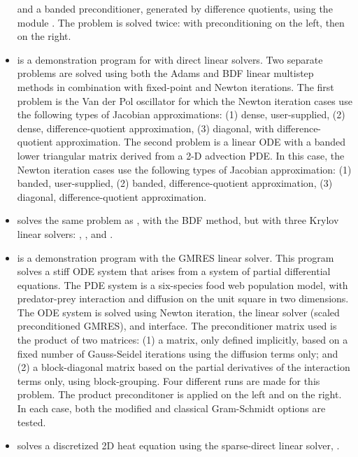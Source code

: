 \begin{itemize}
  and a banded preconditioner, generated by difference quotients,
  using the module {\cvbandpre}.
  \newline
  The problem is solved twice: with preconditioning on the left,
  then on the right.
\item {}
  is a demonstration program for {\cvode} with direct linear solvers.
  \newline
  Two separate problems are solved using both the Adams and BDF linear
  multistep methods in combination with fixed-point and Newton
  iterations.
  \newline
  The first problem is the Van der Pol oscillator for which
  the Newton iteration cases use the following types of Jacobian approximations:
  (1) dense, user-supplied, (2) dense, difference-quotient approximation,
  (3) diagonal, with difference-quotient approximation. The second
  problem is a linear ODE with a
  banded lower triangular matrix derived from a 2-D advection PDE. In this
  case, the Newton iteration cases use the following types of Jacobian
  approximation: (1) banded, user-supplied, (2) banded, difference-quotient
  approximation, (3) diagonal, difference-quotient approximation.
\item {}
  solves the same problem as , with the BDF method, but with
  three Krylov linear solvers: {\sunlinsolspgmr}, {\sunlinsolspbcgs},
  and {\sunlinsolsptfqmr}.
\item {}
  is a demonstration program with the GMRES linear solver.
  \newline
  This program solves a stiff ODE system that arises from a system
  of partial differential equations.  The PDE system is a six-species
  food web population model, with predator-prey interaction and diffusion
  on the unit square in two dimensions.
  \newline
  The ODE system is solved using Newton iteration, the
  {\sunlinsolspgmr} linear solver (scaled preconditioned GMRES), and
  {\cvls} interface.
  \newline
  The preconditioner matrix used is the product of two matrices:
  (1) a matrix, only defined implicitly, based on a fixed number of
  Gauss-Seidel iterations using the diffusion terms only; and
  (2) a block-diagonal matrix based on the partial derivatives of the
  interaction terms only, using block-grouping.
  \newline
  Four different runs are made for this problem.
  The product preconditoner is applied on the left and on the right.
  In each case, both the modified and classical Gram-Schmidt options
  are tested.
\item {} solves a discretized 2D heat equation using
  the {\klu} sparse-direct linear solver, {\sunlinsolklu}.
\end{itemize}

